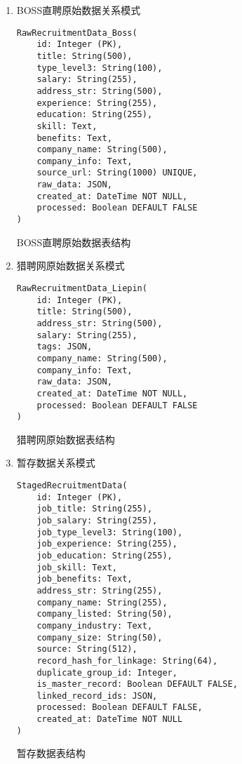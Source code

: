 \begin{enumerate}
  \item BOSS直聘原始数据关系模式
  \begin{listing}[htbp]
    \begin{verbatim}
RawRecruitmentData_Boss(
    id: Integer (PK),
    title: String(500),
    type_level3: String(100),
    salary: String(255),
    address_str: String(500),
    experience: String(255),
    education: String(255),
    skill: Text,
    benefits: Text,
    company_name: String(500),
    company_info: Text,
    source_url: String(1000) UNIQUE,
    raw_data: JSON,
    created_at: DateTime NOT NULL,
    processed: Boolean DEFAULT FALSE
)
    \end{verbatim}
    \caption{BOSS直聘原始数据表结构}\label{lst:raw_boss_schema}
  \end{listing}

  \item 猎聘网原始数据关系模式
  \begin{listing}[htbp]
    \begin{verbatim}
RawRecruitmentData_Liepin(
    id: Integer (PK),
    title: String(500),
    address_str: String(500),
    salary: String(255),
    tags: JSON,
    company_name: String(500),
    company_info: Text,
    raw_data: JSON,
    created_at: DateTime NOT NULL,
    processed: Boolean DEFAULT FALSE
)
    \end{verbatim}
    \caption{猎聘网原始数据表结构}\label{lst:raw_liepin_schema}
  \end{listing}

  \item 暂存数据关系模式
  \begin{listing}[htbp]
    \begin{verbatim}
StagedRecruitmentData(
    id: Integer (PK),
    job_title: String(255),
    job_salary: String(255),
    job_type_level3: String(100),
    job_experience: String(255),
    job_education: String(255),
    job_skill: Text,
    job_benefits: Text,
    address_str: String(255),
    company_name: String(255),
    company_listed: String(50),
    company_industry: Text,
    company_size: String(50),
    source: String(512),
    record_hash_for_linkage: String(64),
    duplicate_group_id: Integer,
    is_master_record: Boolean DEFAULT FALSE,
    linked_record_ids: JSON,
    processed: Boolean DEFAULT FALSE,
    created_at: DateTime NOT NULL
)
    \end{verbatim}
    \caption{暂存数据表结构}\label{lst:staged_data_schema}
  \end{listing}
\end{enumerate}

